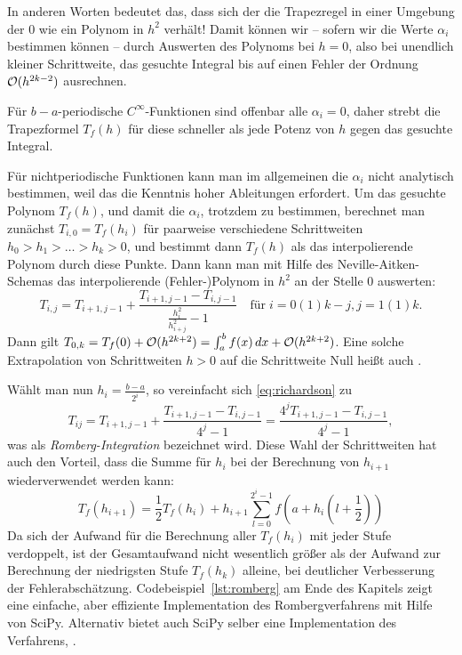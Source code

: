 In anderen Worten bedeutet das, dass sich der die Trapezregel in einer
Umgebung der 0 wie ein Polynom in $h^2$ verhält!  Damit können wir --
sofern wir die Werte $\alpha_i$ bestimmen können -- durch Auswerten
des Polynoms bei $h=0$, also bei unendlich kleiner Schrittweite, das
gesuchte Integral bis auf einen Fehler der Ordnung $\mathcal O(h^{2k-2})$
ausrechnen.

Für $b-a$-periodische $C^\infty$-Funktionen sind offenbar alle
$\alpha_i=0$, daher strebt die Trapezformel $T_f(h)$ für diese
schneller als jede Potenz von $h$ gegen das gesuchte Integral.

Für nichtperiodische Funktionen kann man im allgemeinen die $\alpha_i$
nicht analytisch bestimmen, weil das die Kenntnis hoher Ableitungen
erfordert. Um das gesuchte Polynom $T_f(h)$, und damit die $\alpha_i$,
trotzdem zu bestimmen, berechnet man zunächst $T_{i,0}=T_f(h_i)$ für
paarweise verschiedene Schrittweiten $h_0>h_1>\ldots>h_k>0$, und
bestimmt dann $T_f(h)$ als das interpolierende Polynom durch diese
Punkte. Dann kann man mit Hilfe des Neville-Aitken-Schemas das
interpolierende (Fehler-)Polynom in $h^2$ an der Stelle $0$ auswerten:
\begin{equation}
  \label{eq:richardson}
  T_{i,j} = T_{i+1,j-1} + \frac{T_{i+1,j-1} -
    T_{i,j-1}}{\frac{h_i^2}{h_{i+j}^2} -1}
  \quad\text{für}\; i=0(1)k-j, j=1(1)k.
\end{equation}
Dann gilt $T_{0,k} = T_f(0) + \mathcal O(h^{2k+2}) = \int_a^b f(x)\,dx +
\mathcal O(h^{2k+2})$. Eine solche Extrapolation von Schrittweiten $h>0$ auf
die Schrittweite Null heißt auch
\emph{}.

Wählt man nun $h_i = \frac{b-a}{2^i}$, so vereinfacht sich
\eqref{eq:richardson} zu
\begin{equation}
  T_{ij} = T_{i+1,j-1} + \frac{T_{i+1,j-1} -
    T_{i,j-1}}{4^j - 1} = \frac{4^j T_{i+1,j-1} -
    T_{i,j-1}}{4^j - 1},
\end{equation}
was als \emph{Romberg-Integration} bezeichnet wird. Diese Wahl
der Schrittweiten hat auch den Vorteil, dass die Summe für $h_i$ bei
der Berechnung von $h_{i+1}$ wiederverwendet werden kann:
\begin{equation}
  T_f(h_{i+1}) = \frac{1}{2} T_f(h_i) +
  h_{i+1}\sum_{l=0}^{2^i-1} f\left(a + h_i\left(l
      + \frac{1}{2}\right)\right)
\end{equation}
Da sich der Aufwand für die Berechnung aller $T_f(h_i)$ mit jeder
Stufe verdoppelt, ist der Gesamtaufwand nicht wesentlich größer als
der Aufwand zur Berechnung der niedrigsten Stufe $T_f(h_k)$ alleine,
bei deutlicher Verbesserung der
Fehlerabschätzung. Codebeispiel~\ref{lst:romberg} am Ende des Kapitels
zeigt eine einfache, aber effiziente Implementation des
Rombergverfahrens mit Hilfe von SciPy. Alternativ bietet auch SciPy
selber eine Implementation des Verfahrens,
.

